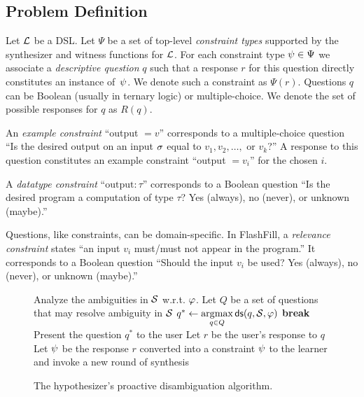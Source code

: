 \subsection{Problem Definition}
Let $\mathcal{L}$ be a DSL.
Let $\Psi$ be a set of top-level \emph{constraint types} supported by the synthesizer and witness functions for $\mathcal{L}$.
For each constraint type $\psi \in \Psi$ we associate a \emph{descriptive question} $q$ such that a
response $r$ for this question directly constitutes an instance of~$\psi$.
We denote such a constraint as $\Psi(r)$.
Questions $q$ can be Boolean (usually in ternary logic) or multiple-choice.
We denote the set of possible responses for $q$ as $R(q)$.

\begin{example}
    An \emph{example constraint} ``output $= v$'' corresponds to a multiple-choice question ``Is the desired output on
    an input $\sigma$ equal to $v_1, v_2, \dots, \text{ or } v_k$?''
    A response to this question constitutes an example constraint ``output $= v_i$'' for the chosen $i$.

    A \emph{datatype constraint} ``$\text{output}\colon \tau$'' corresponds to a Boolean question ``Is the desired
    program a computation of type $\tau$?
    Yes (always), no (never), or unknown (maybe).''

    Questions, like constraints, can be domain-specific.
    In FlashFill, a \emph{relevance constraint} states ``an input $v_i$ must/must not appear in the program.''
    It corresponds to a Boolean question ``Should the input $v_i$ be used?
    Yes (always), no (never), or unknown (maybe).''
\end{example}

\begin{figure}[t]
    \centering
    \uwsinglespace
    \begin{algorithmic}[1]
        \NoNumber {}
        \addtocounter{ALG@line}{-1} \WithNumber
        \State Analyze the ambiguities in $\mathcal{S}$ w.r.t.
$\varphi$.
        \Statex Let $Q$ be a set of questions that may resolve ambiguity in $\mathcal{S}$
        \Statex {}
        \State $q^{*} \gets \operatorname*{\arg\!\max}\limits_{q \in Q} \mathsf{ds}(q, \mathcal{S}, \varphi) $
        \State \textbf{break}
        \Else
        \State Present the question $q^{*}$ to the user
        \State Let $r$ be the user's response to $q$
        \State Let $\psi$ be the response $r$ converted into a constraint
        \State \Return $\psi$ to the learner and invoke a new round of synthesis
        \EndIf
        \EndProcedure
    \end{algorithmic}
    \vspace{\baselineskip}
    \caption{The hypothesizer's proactive disambiguation algorithm.}
    \label{fig:feedback:algorithm}
\end{figure}

